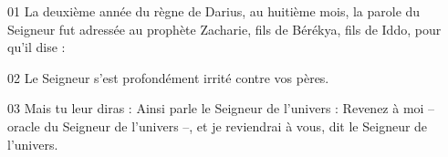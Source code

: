 01 La deuxième année du règne de Darius, au huitième mois, la parole du Seigneur fut adressée au prophète Zacharie, fils de Bérékya, fils de Iddo, pour qu’il dise :

02 Le Seigneur s’est profondément irrité contre vos pères.

03 Mais tu leur diras : Ainsi parle le Seigneur de l’univers : Revenez à moi – oracle du Seigneur de l’univers –, et je reviendrai à vous, dit le Seigneur de l’univers.
